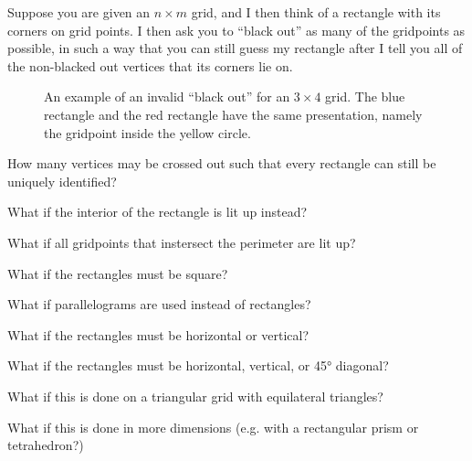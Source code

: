 \documentclass{article}
\begin{document}
Suppose you are given an $n \times m$ grid, and I then think of a rectangle with
its corners on grid points.
I then ask you to ``black out'' as many of the gridpoints as possible,
in such a way that you can still guess my rectangle after I tell you all of the
non-blacked out vertices that its corners lie on.\\
\begin{figure}[!h]
  \centering
  \caption{
    An example of an invalid ``black out'' for an $3 \times 4$ grid.
    The blue rectangle and the red rectangle have the same presentation, namely
    the gridpoint inside the yellow circle.
  }
\end{figure}

\begin{question}
  How many vertices may be crossed out such that every rectangle can still
    be uniquely identified?
\end{question}
\begin{related}
  \item What if the interior of the rectangle is lit up instead?
  \item What if all gridpoints that instersect the perimeter are lit up?
  \item What if the rectangles must be square?
  \item What if parallelograms are used instead of rectangles?
  \item What if the rectangles must be horizontal or vertical?
  \item What if the rectangles must be horizontal, vertical, or 45° diagonal?
  \item What if this is done on a triangular grid with equilateral triangles?
  \item What if this is done in more dimensions
    (e.g. with a rectangular prism or tetrahedron?)
\end{related}
\end{document}
